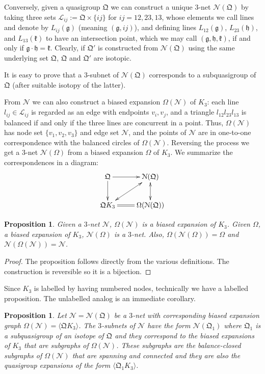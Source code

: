 \documentclass[reqno,12pt]{amsart}
\newtheorem{prop}[thm]{Proposition}
\theoremstyle{remark}
\numberwithin{equation}{section}
\numberwithin{figure}{section}
\newcommand \bgr[1]{\langle#1\rangle}
\renewcommand \cL{\mathcal{L}}	%
\newcommand \cN{\mathcal{N}}
\newcommand \fQ{\mathfrak Q}
\newcommand\Qg{\mathfrak g}
\newcommand\Qh{\mathfrak h}
\newcommand\Qk{\mathfrak k}
\begin{document}
Conversely, given a quasigroup $\fQ$ we can construct a unique $3$-net $\cN(\fQ)$ by taking three sets $\cL_{ij}:=\fQ\times\{ij\}$ for $ij=12,23,13$, whose elements we call lines and denote by $L_{ij}(\Qg)$ (meaning $(\Qg,ij)$), and defining lines $L_{12}(\Qg)$, $L_{23}(\Qh)$, and $L_{13}(\Qk)$ to have an intersection point, which we may call $(\Qg,\Qh,\Qk)$, if and only if $\Qg\cdot\Qh=\Qk$.  Clearly, if $\fQ'$ is constructed from $\cN(\fQ)$ using the same underlying set $\fQ$, $\fQ$ and $\fQ'$ are isotopic.

It is easy to prove that a $3$-subnet of $\cN(\fQ)$ corresponds to a subquasigroup of $\fQ$ (after suitable isotopy of the latter).

From $\cN$ we can also construct a biased expansion $\Omega(\cN)$ of $K_3$:  each line $l_{ij}\in \cL_{ij}$ is regarded as an edge with endpoints $v_i,v_j$, and a triangle $l_{12}l_{23}l_{13}$ is balanced if and only if the three lines are concurrent in a point.  Thus, $\Omega(\cN)$ has node set $\{v_1,v_2,v_3\}$ and edge set $\cN$, and the points of $\cN$ are in one-to-one correspondence with the balanced circles of $\Omega(\cN)$.  Reversing the process we get a $3$-net $\cN(\Omega)$ from a biased expansion $\Omega$ of $K_3$.  
We summarize the correspondences in a diagram:  
$$
\xymatrix{
\fQ \ar[r]\ar[d]	&\cN(\fQ) \ar@{<->}[d]	\\
\fQ K_3 \ar@{=}[r]\ar@{<->}[ur]	&\Omega(\cN(\fQ))
}
$$

\begin{prop} \label{PD:net}
Given a $3$-net $\cN$, $\Omega(\cN)$ is a biased expansion of $K_3$.  Given $\Omega$, a biased expansion of $K_3$, $\cN(\Omega)$ is a $3$-net.  Also, $\Omega(\cN(\Omega))=\Omega$ and $\cN(\Omega(\cN))=\cN$. 
\end{prop}

\begin{proof}  
The proposition follows directly from the various definitions.  The construction is reversible so it is a bijection.  
\end{proof}

Since $K_3$ is labelled by having numbered nodes, technically we have a labelled proposition.  The unlabelled analog is an immediate corollary.

\begin{prop}  \label{PD:subnet}
Let $\cN=\cN(\fQ)$ be a $3$-net with corresponding biased expansion graph $\Omega(\cN) = \bgr{\fQ K_3}$.  
The $3$-subnets of $\cN$ have the form $\cN(\fQ_1)$ where $\fQ_1$ is a subquasigroup of an isotope of $\fQ$ and they correspond to the biased expansions of $K_3$ that are subgraphs of $\Omega(\cN)$.
These subgraphs are the balance-closed subgraphs of $\Omega(\cN)$ that are spanning and connected and they are also the quasigroup expansions of the form $\bgr{\fQ_1 K_3}$.
\end{prop}
\end{document}
